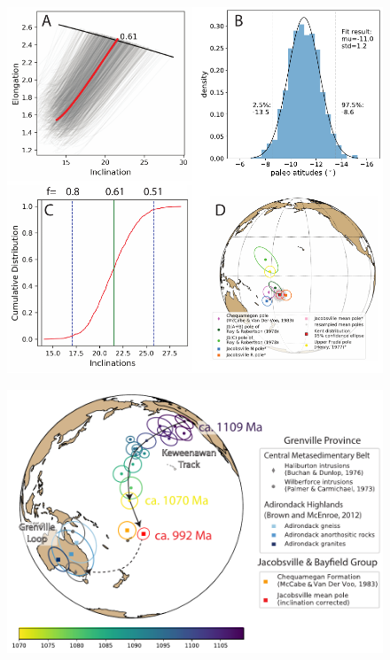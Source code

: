 \documentclass[draft]{agujournal2019}
\begin{document}
\begin{figure}[h!]
\centering
\includegraphics[width=\textwidth]{EI_results.pdf}
\caption{}
\label{fig:EI_results}
\end{figure}

\begin{figure}[h!]
\centering
\includegraphics[width=\textwidth]{Jacobsville_pole_plot.pdf}
\caption{}
\label{fig:pole_plot}
\end{figure}
\end{document}
